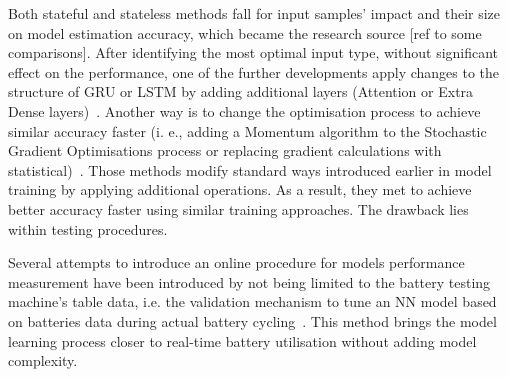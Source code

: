 %
%
Both stateful and stateless methods fall for input samples' impact and their size on model estimation accuracy, which became the research source [ref to some comparisons].
After identifying the most optimal input type, without significant effect on the performance, one of the further developments apply changes to the structure of GRU or LSTM by adding additional layers (Attention or Extra Dense layers)~\cite{mamo_long_2020, jiao_gru-rnn_2020}.
Another way is to change the optimisation process to achieve similar accuracy faster (i. e., adding a Momentum algorithm to the Stochastic Gradient Optimisations process or replacing gradient calculations with statistical)~\cite{xiao_accurate_2019, javid_adaptive_2020}.
Those methods modify standard ways introduced earlier in model training by applying additional operations.
As a result, they met to achieve better accuracy faster using similar training approaches.
The drawback lies within testing procedures.

%
%
Several attempts to introduce an online procedure for models performance measurement have been introduced by not being limited to the battery testing machine's table data, i.e. the validation mechanism to tune an NN model based on batteries data during actual battery cycling~\cite{zhang_deep_2020}.
This method brings the model learning process closer to real-time battery utilisation without adding model complexity.

